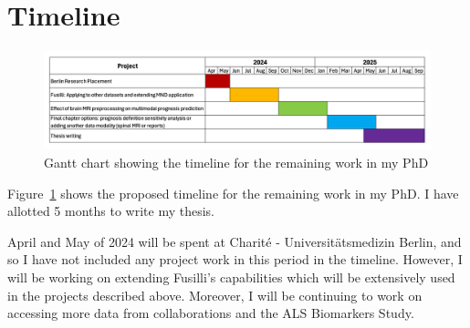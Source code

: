 \section{Timeline}

\begin{figure}
    \centering
    \hspace*{-0.1\textwidth}
    \includegraphics[width=1.2\textwidth]{figures/gantt_chart}
    \caption{Gantt chart showing the timeline for the remaining work in my PhD}
    \label{fig:gantt_chart}
\end{figure}

Figure~\ref{fig:gantt_chart} shows the proposed timeline for the remaining work in my PhD.
I have allotted 5 months to write my thesis.

April and May of 2024 will be spent at Charité - Universitätsmedizin Berlin, and so I have not included any project work in this period in the timeline.
However, I will be working on extending Fusilli's capabilities which will be extensively used in the projects described above.
Moreover, I will be continuing to work on accessing more data from collaborations and the ALS Biomarkers Study.
